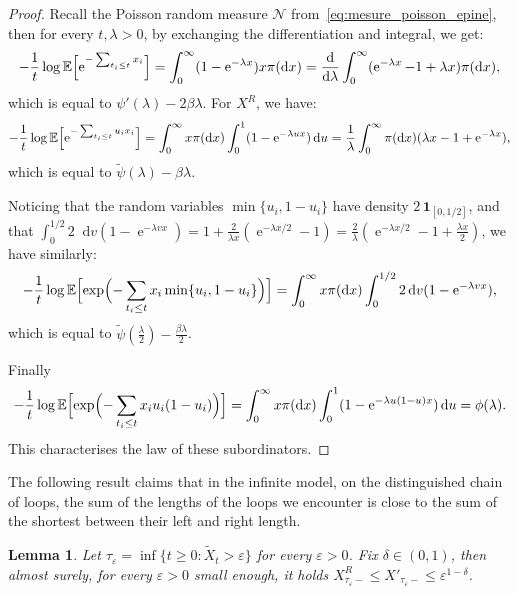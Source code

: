 \documentclass[british, a4paper,11pt]{article}
\numberwithin{equation}{section}
\newtheorem{lem}[thm]{Lemma}
\theoremstyle{definition}
\newcommand{\E}{\mathop{}\!\mathbb{E}}
\newcommand{\e}{\operatorname{e}}
\renewcommand{\d}{\mathop{}\!\mathrm{d}}
\begin{document}
\begin{proof}
Recall the Poisson random measure $\mathscr{N}$ from~\eqref{eq:mesure_poisson_epine}, then for every $t,\lambda > 0$, by exchanging the differentiation and integral, we get:
\[- \frac{1}{t} \log \E\Bigl[\e^{- \sum_{t_{i} \leq t} x_{i}}\Bigr]
= \int_{0}^{\infty} (1-\e^{-\lambda x}) x \pi(\d x)
= \frac{\d}{\d\lambda} \int_{0}^{\infty} (\e^{-\lambda x} - 1 + \lambda x) \pi(\d x),
\]
which is equal to $\psi'(\lambda) - 2\beta\lambda$.
For $X^R$, we have:
\[- \frac{1}{t} \log \E\Bigl[ \e^{- \sum_{t_{i} \leq t} u_{i} x_{i}}\Bigr]
= \int_{0}^{\infty} x \pi(\d x) \int_0^1 (1-\e^{-\lambda u x}) \d u
= \frac{1}{\lambda} \int_{0}^{\infty} \pi(\d x) (\lambda x - 1 + \e^{-\lambda x}),\]
which is equal to $\widetilde{\psi}(\lambda) - \beta\lambda$.

Noticing that the random variables $\min\{u_{i}, 1-u_{i}\}$ have density $2\,\mathbf{1}_{[0,1/2]}$, and that 
$\int_{0}^{1/2} 2 \d v (1-\e^{-\lambda v x})
= 1 + \frac{2}{\lambda x} (\e^{-\lambda x/2} - 1)
= \frac{2}{\lambda} (\e^{-\lambda x/2} - 1 + \frac{\lambda x}{2})$, 
we have similarly:
\[- \frac{1}{t} \log \E\Bigl[\exp\Bigl(- \sum_{t_{i} \leq t} x_{i} \min\{u_{i}, 1-u_{i}\}\Bigr)\Bigr]
= \int_{0}^{\infty} x \pi(\d x) \int_{0}^{1/2} 2 \d v (1-\e^{-\lambda v x}),
\]
which is equal to $\widetilde{\psi}(\frac{\lambda}{2}) - \frac{\beta \lambda}{2}$.

Finally
\[- \frac{1}{t} \log \E\Bigl[\exp\Bigl(- \sum_{t_{i} \leq t} x_{i} u_{i} (1-u_{i})\Bigr)\Bigr]
= \int_{0}^{\infty} x \pi(\d x) \int_0^1 (1-\e^{-\lambda u(1-u) x}) \d u
= \phi(\lambda).\]
This characterises the law of these subordinators.
\end{proof}

The following result claims that in the infinite model, on the distinguished chain of loops, the sum of the lengths of the loops we encounter is close to the sum of the shortest between their left and right length. 

\begin{lem}\label{lem:comparaison_distance_looptrees_tailles_boucles}
Let $\tau_\varepsilon = \inf\{t \geq 0 \colon \widetilde{X}_{t} > \varepsilon\}$ for every $\varepsilon>0$.
Fix $\delta \in (0, 1)$, then almost surely, for every $\varepsilon>0$ small enough, it holds $X^R_{\tau_{\varepsilon}-} \leq X'_{\tau_{\varepsilon}-} \leq \varepsilon^{1-\delta}$.
\end{lem}
\end{document}
